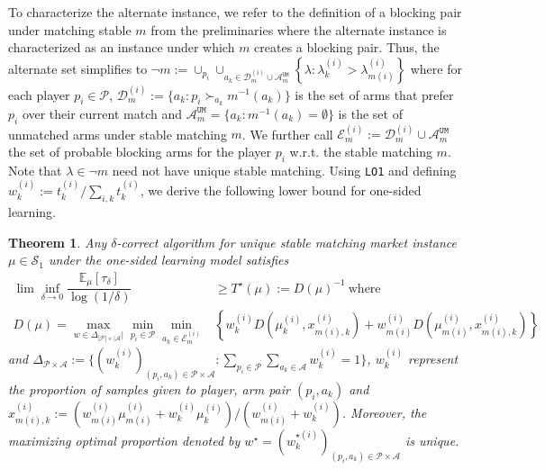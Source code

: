 \documentclass{article}
\newcommand{\UMA}{\mathcal{A}^{\texttt{UM}}}
\newcommand{\E}{\mathbb{E}}
\newtheorem{theorem}{Theorem}
\begin{document}
To characterize the alternate instance, we refer to the definition of a blocking pair under matching stable $m$ from the preliminaries where the alternate instance is characterized as an instance under which $m$ creates a blocking pair. Thus, the alternate set simplifies to $\neg m:=\cup_{p_i}\cup_{a_k\in\mathcal{D}^{(i)}_m\cup \UMA_m}\left\{\lambda: \lambda^{(i)}_k>\lambda^{(i)}_{m(i)}\right\}$ where for each player $p_i\in\mathcal{P}$, $\mathcal{D}^{(i)}_m:=\{a_k:p_i\succ_{a_k}m^{-1}(a_k)\}$ is the set of arms that prefer $p_i$ over their current match and $\UMA_m = \{a_k:m^{-1}(a_k)=\emptyset\}$ is the set of unmatched arms under stable matching $m$. We further call $\mathcal{E}_{m}^{(i)}:=\mathcal{D}^{(i)}_m\cup\UMA_m$ the set of probable blocking arms for the player $p_i$ w.r.t. the stable matching $m$. Note that $\lambda\in \neg m$ need not have unique stable matching. Using \texttt{LO1} and defining $w^{(i)}_k:=t^{(i)}_k/\sum_{i,k}t^{(i)}_k$, we derive the following lower bound for one-sided learning.
\begin{theorem}
    Any $\delta$-correct algorithm for unique stable matching market  instance $\mu\in \mathcal{S}_1$  under the one-sided learning model satisfies
    \begin{align*}
        \lim\inf_{\delta\to 0}\dfrac{\E_{\mu}[\tau_{\delta}]}{\log(1/\delta)}&\geq T^{\star}(\mu):=D(\mu)^{-1} \ \text{where}\\
        D(\mu) =\max_{w\in\Delta_{|\mathcal{P}|\times|\mathcal{A}}|}\min_{p_i\in\mathcal{P}}\min_{a_k\in\mathcal{E}_{m}^{(i)}}&\left\{w^{(i)}_{k}D\left(\mu^{(i)}_{k},x^{(i)}_{m(i),k}\right)+w^{(i)}_{m(i)}D\left(\mu^{(i)}_{m(i)},x^{(i)}_{m(i),k}\right)\right\}
    \end{align*}
   and $\Delta_{\mathcal{P}\times\mathcal{A}}:=\{(w^{(i)}_k)_{(p_i,a_k)\in\mathcal{P}\times\mathcal{A}}: \sum_{p_i\in\mathcal{P}}\sum_{a_k\in\mathcal{A}}w^{(i)}_k=1\}$, $w^{(i)}_k$ represent the proportion of samples given to player, arm pair $(p_i,a_k)$ and $x^{(i)}_{m(i),k}:=(w^{(i)}_{m(i)}\mu^{(i)}_{m(i)}+w^{(i)}_{k}\mu^{(i)}_{k})/(w^{(i)}_{m(i)}+w^{(i)}_{k})$. 
   Moreover, the maximizing optimal proportion denoted by $w^{\star}=(w^{\star(i)}_k)_{(p_i,a_k)\in\mathcal{P}\times\mathcal{A}}$ is unique. 
   \label{thm:optimalonesided}
\end{theorem}
\end{document}
